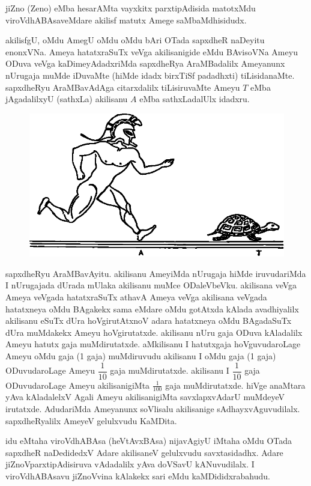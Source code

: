 jiZno {\rm (Zeno)} eMba hesarAMta vayxkitx parxtipAdisida matotxMdu viroVdhABAsaveMdare akilisf matutx Amege saMbaMdhisidudx.

akilisfgU, oMdu AmegU oMdu oMdu bAri OTada sapxdheR naDeyitu enonxVNa. Ameya hatatxraSuTx veVga akilisanigide eMdu BAvisoVNa Ameyu ODuva veVga kaDimeyAdadxriMda sapxdheRya AraMBadalilx Ameyanunx nUrugaja muMde iDuvaMte (hiMde idadx birxTiSf padadhxti) tiLisidanaMte. sapxdheRyu AraMBavAdAga citarxdalilx tiLisiruvaMte Ameyu $T$ eMba jAgadalilxyU (sathxLa) akilisanu $A$ eMba sathxLadalUlx idadxru. 
\begin{figure}[H]
\centering
\includegraphics[scale=.8]{src/figures/m_085.eps}
\end{figure}


sapxdheRyu AraMBavAyitu. akilisanu AmeyiMda nUrugaja hiMde iruvudariMda I nUrugajada dUrada mUlaka akilisanu muMce ODaleVbeVku. akilisana veVga Ameya veVgada hatatxraSuTx athavA Ameya veVga akilisana veVgada hatatxneya oMdu BAgakekx sama eMdare oMdu gotAtxda kAlada avadhiyalilx akilisanu eSuTx dUra hoVgirutAtxnoV adara hatatxneya oMdu BAgadaSuTx dUra muMdakekx Ameyu hoVgirutatxde. akilisanu nUru gaja ODuva kAladalilx Ameyu hatutx gaja muMdirutatxde. aMkilisanu I hatutxgaja hoVguvudaroLage Ameyu oMdu gaja ({\rm 1} gaja) muMdiruvudu akilisanu I oMdu gaja ({\rm 1} gaja) ODuvudaroLage Ameyu $\dfrac{1}{10}$ gaja muMdirutatxde. akilisanu I $\dfrac{1}{10}$ gaja ODuvudaroLage Ameyu akilisanigiMta $\frac{1}{100}$ gaja muMdirutatxde. hiVge anaMtara yAva kAladalelxV Agali Ameyu akilisanigiMta savxlapxvAdarU muMdeyeV irutatxde. AdudariMda Ameyanunx soVlisalu akilisanige sAdhayxvAguvudilalx. sapxdheRyalilx AmeyeV gelulxvudu KaMDita.

idu eMtaha viroVdhABAsa (heVtAvxBAsa) nijavAgiyU iMtaha oMdu OTada sapxdheR naDedidedxV Adare akilisaneV gelulxvudu savxtasidadhx. Adare jiZnoVparxtipAdisiruva vAdadalilx yAva doVSavU kANuvudilalx. I viroVdhABAsavu  jiZnoVvina kAlakekx sari eMdu kaMDididxrabahudu.

